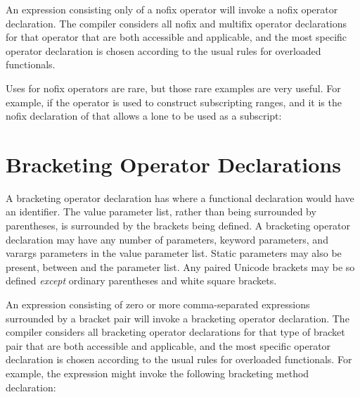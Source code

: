 An expression consisting only of a nofix operator
will invoke a nofix operator declaration.
The compiler considers all nofix and multifix
operator declarations
for that operator that are both
accessible and applicable, and the most specific operator declaration
is chosen according to the usual rules for overloaded functionals.

Uses for nofix operators are rare, but those rare examples are very useful.
For example, if the  operator is used to construct subscripting ranges,
and it is the nofix declaration of  that allows a lone  to be
used as a subscript:



\section{Bracketing Operator Declarations}

A bracketing operator declaration has 
where a functional declaration would have an identifier.
The value parameter list, rather than being surrounded by parentheses,
is surrounded by the brackets being defined.  A bracketing operator
declaration may have any number of parameters, keyword parameters,
and varargs parameters in the value parameter list.  Static parameters may
also be present, between  and the parameter list.  Any paired
Unicode brackets
may be so defined \emph{except} ordinary parentheses
and white square brackets.

An expression consisting of zero or more comma-separated expressions
surrounded by a  bracket pair will invoke a bracketing operator
declaration.  The compiler considers all bracketing operator
declarations for that type of bracket pair that are both accessible and applicable, and the most
specific operator declaration is chosen according to the usual rules for
overloaded functionals.
For example, the expression  might invoke the
following bracketing method declaration:

